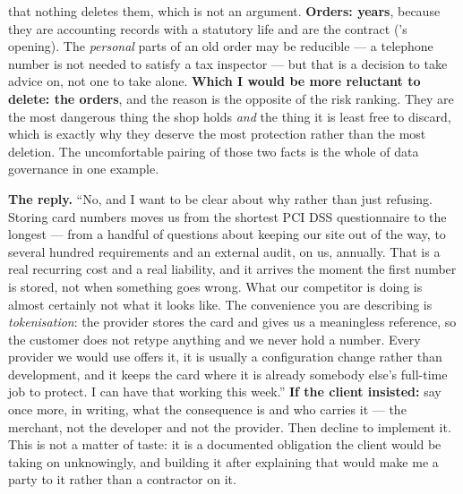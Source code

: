 \begin{ans}
        that nothing deletes them, which is not an argument.
        \textbf{Orders: years}, because they are accounting records with a
        statutory life and are the contract ('s opening). The
        \emph{personal} parts of an old order may be reducible --- a telephone
        number is not needed to satisfy a tax inspector --- but that is a
        decision to take advice on, not one to take alone.
        \textbf{Which I would be more reluctant to delete: the orders}, and the
        reason is the opposite of the risk ranking. They are the most dangerous
        thing the shop holds \emph{and} the thing it is least free to discard,
        which is exactly why they deserve the most protection rather than the
        most deletion. The uncomfortable pairing of those two facts is the
        whole of data governance in one example.
  \item \textbf{The reply.}
        \smallskip
        ``No, and I want to be clear about why rather than just refusing.
        Storing card numbers moves us from the shortest PCI DSS questionnaire
        to the longest --- from a handful of questions about keeping our site
        out of the way, to several hundred requirements and an external audit,
        on us, annually. That is a real recurring cost and a real liability,
        and it arrives the moment the first number is stored, not when
        something goes wrong.
        \smallskip
        What our competitor is doing is almost certainly not what it looks
        like. The convenience you are describing is \emph{tokenisation}: the
        provider stores the card and gives us a meaningless reference, so the
        customer does not retype anything and we never hold a number. Every
        provider we would use offers it, it is usually a configuration change
        rather than development, and it keeps the card where it is already
        somebody else's full-time job to protect.
        \smallskip
        I can have that working this week.''
        \smallskip
        \textbf{If the client insisted:} say once more, in writing, what the
        consequence is and who carries it --- the merchant, not the developer
        and not the provider. Then decline to implement it. This is not a
        matter of taste: it is a documented obligation the client would be
        taking on unknowingly, and building it after explaining that would make
        me a party to it rather than a contractor on it.
\end{ans}

